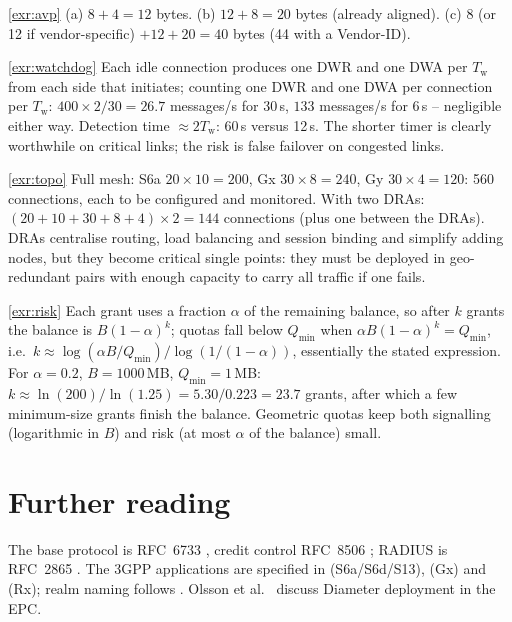 \documentclass[11pt,a4paper]{article}
\begin{document}
\begin{solutionbox}{\ref{exr:avp}}
(a) $8+4 = 12$ bytes. (b) $12 + 8 = 20$ bytes (already aligned). (c) $8$ (or 12 if vendor-specific) $+12+20 =
40$ bytes (44 with a Vendor-ID).
\end{solutionbox}

\begin{solutionbox}{\ref{exr:watchdog}}
Each idle connection produces one DWR and one DWA per $T_\mathrm{w}$ from each side that initiates; counting one DWR
and one DWA per connection per $T_\mathrm{w}$: $400\times2/30 = 26.7$ messages/s for 30\,s, $133$ messages/s for
6\,s -- negligible either way. Detection time $\approx 2T_\mathrm{w}$: 60\,s versus 12\,s. The shorter timer is clearly
worthwhile on critical links; the risk is false failover on congested links.
\end{solutionbox}

\begin{solutionbox}{\ref{exr:topo}}
Full mesh: S6a $20\times10 = 200$, Gx $30\times8 = 240$, Gy $30\times4 = 120$: 560 connections, each to be
configured and monitored. With two DRAs: $(20+10+30+8+4)\times2 = 144$ connections (plus one between the DRAs).
DRAs centralise routing, load balancing and session binding and simplify adding nodes, but they become critical
single points: they must be deployed in geo-redundant pairs with enough capacity to carry all traffic if one
fails.
\end{solutionbox}

\begin{solutionbox}{\ref{exr:risk}}
Each grant uses a fraction $\alpha$ of the remaining balance, so after $k$ grants the balance is $B(1-\alpha)^k$;
quotas fall below $Q_{\min}$ when $\alpha B(1-\alpha)^k = Q_{\min}$, i.e.\
$k \approx \log(\alpha B/Q_{\min})/\log(1/(1-\alpha))$, essentially the stated expression. For $\alpha=0.2$,
$B = 1000$\,MB, $Q_{\min} = 1$\,MB: $k \approx \ln(200)/\ln(1.25) = 5.30/0.223 = 23.7$ grants, after which a few
minimum-size grants finish the balance. Geometric quotas keep both signalling (logarithmic in $B$) and risk
(at most $\alpha$ of the balance) small.
\end{solutionbox}

\section{Further reading}
The base protocol is RFC~6733 \cite{rfc6733}, credit control RFC~8506 \cite{rfc8506}; RADIUS is RFC~2865
\cite{rfc2865}. The 3GPP applications are specified in \cite{ts29272} (S6a/S6d/S13), \cite{ts29212} (Gx) and
\cite{ts29214} (Rx); realm naming follows \cite{ts23003}. Olsson et al.\ \cite{olsson2013epc} discuss Diameter
deployment in the EPC.

\printbibliography[heading=subbibliography,title={\ACNstrRefs}]
\end{document}
